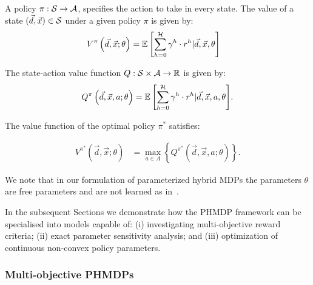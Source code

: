 A policy {\footnotesize $\pi : \mathcal{S} \rightarrow \mathcal{A}$}, specifies the action to take in every state. The value of a state {\footnotesize $(\vec{d}, \vec{x}) \in \mathcal{S}$} under a given policy {\footnotesize$\pi$} is given by:
{\footnotesize 
    \abovedisplayskip=0pt
    \belowdisplayskip=0pt
\begin{align*}
    V^{\pi}\left( \vec{d}, \vec{x}; \theta \right) &= {\mathbb{E}\left[{\sum\limits_{h = 0}^{\mathcal{H}} \gamma^h \cdot r^h | \vec{d}, \vec{x}, \theta}\right]} \nonumber  
\end{align*}
}

The state-action value function {\footnotesize$Q : \mathcal{S} \times \mathcal{A} \rightarrow \mathbb{R}$} is given by:
{\footnotesize 
    \abovedisplayskip=0pt
    \belowdisplayskip=0pt
\begin{align*}
    Q^{\pi}\left(\vec{d}, \vec{x}, a; \theta\right) = {\mathbb{E}\left[{\sum\limits_{h = 0}^{\mathcal{H}} \gamma^h \cdot r^h | \vec{d}, \vec{x}, a, \theta}\right]}.
\end{align*}
}

The value function of the optimal policy {\footnotesize$ \pi^{*} $} satisfies:

{\footnotesize 
\abovedisplayskip=0pt
\belowdisplayskip=0pt
\begin{align}
    \label{eq:opt_vfunc}
    V^{\pi^{*}}(\vec{d}, \vec{x}; \theta) &= \max_{a \in A} \left\{ Q^{\pi^{*}}(\vec{d}, \vec{x}, a; \theta) \right\}. 
\end{align}
}%

We note that in our formulation of parameterized hybrid MDPs the parameters {\footnotesize $ \theta $} are free parameters and are not learned as in~\parencite{Dearden_UAI_1999}.

In the subsequent Sections we demonstrate how the PHMDP framework can be specialised into models capable of: (i) investigating multi-objective reward criteria; (ii) exact parameter sensitivity analysis; and (iii) optimization of continuous non-convex policy parameters.

\subsubsection{Multi-objective PHMDPs}

